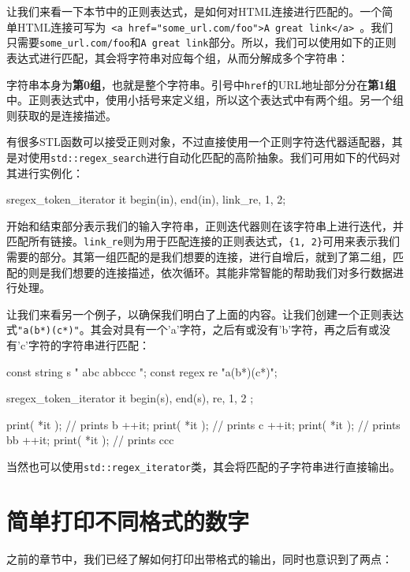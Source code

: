 让我们来看一下本节中的正则表达式，是如何对HTML连接进行匹配的。一个简单HTML连接可写为\texttt{ <a href="some\_url.com/foo">A great link</a> }。我们只需要\texttt{some\_url.com/foo}和\texttt{A great link}部分。所以，我们可以使用如下的正则表达式进行匹配，其会将字符串对应每个组，从而分解成多个字符串：


字符串本身为\textbf{第0组}，也就是整个字符串。引号中\texttt{href}的URL地址部分分在\textbf{第1组}中。正则表达式中，使用小括号来定义组，所以这个表达式中有两个组。另一个组则获取的是连接描述。

有很多STL函数可以接受正则对象，不过直接使用一个正则字符迭代器适配器，其是对使用\texttt{std::regex\_search}进行自动化匹配的高阶抽象。我们可用如下的代码对其进行实例化：

\begin{codebox}[cpp]
sregex_token_iterator it {begin(in), end(in), link_re, {1, 2}};
\end{codebox}

开始和结束部分表示我们的输入字符串，正则迭代器则在该字符串上进行迭代，并匹配所有链接。\texttt{link\_re}则为用于匹配连接的正则表达式，\texttt{\{1, 2\}}可用来表示我们需要的部分。其第一组匹配的是我们想要的连接，进行自增后，就到了第二组，匹配的则是我们想要的连接描述，依次循环。其能非常智能的帮助我们对多行数据进行处理。

让我们来看另一个例子，以确保我们明白了上面的内容。让我们创建一个正则表达式\texttt{"a(b*)(c*)"}。其会对具有一个'a'字符，之后有或没有'b'字符，再之后有或没有'c'字符的字符串进行匹配：

\begin{codebox}[cpp]
const string s {" abc abbccc "};
const regex re {"a(b*)(c*)"};

sregex_token_iterator it {
    begin(s), end(s), re, {1, 2} 
};

print( *it ); // prints b
++it;
print( *it ); // prints c
++it;
print( *it ); // prints bb
++it;
print( *it ); // prints ccc
\end{codebox}

当然也可以使用\texttt{std::regex\_iterator}类，其会将匹配的子字符串进行直接输出。


\section{简单打印不同格式的数字}

之前的章节中，我们已经了解如何打印出带格式的输出，同时也意识到了两点：

